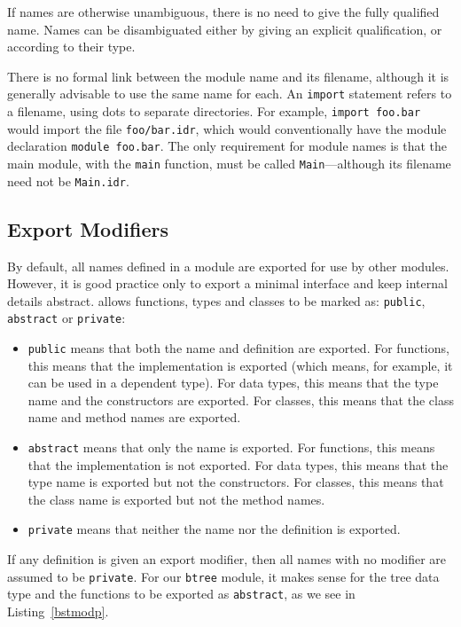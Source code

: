 \noindent
If names are otherwise unambiguous, there is no need to give the fully qualified name.
Names can be disambiguated either by giving an explicit qualification, or according to their type.

There is no formal link between the module name and its filename, although it is generally advisable to use the same name for each.
An \texttt{import} statement refers to a filename, using dots to separate directories.
For example, \texttt{import foo.bar} would import the file \texttt{foo/bar.idr}, which would conventionally have the module declaration \texttt{module foo.bar}.
The only requirement for module names is that the main module, with the \texttt{main} function, must be called \texttt{Main}---although its filename need not be \texttt{Main.idr}.

\subsection{Export Modifiers}

By default, all names defined in a module are exported for use by other modules.
However, it is good practice only to export a minimal interface and keep internal details abstract.
\Idris{} allows functions, types and classes to be marked as: \texttt{public}, \texttt{abstract} or \texttt{private}:

\begin{itemize}
\item \texttt{public} means that both the name and definition are exported.
For functions, this means that the implementation is exported (which means, for example, it can be used in a dependent type).
For data types, this means that the type name and the constructors are exported.
For classes, this means that the class name and method names are exported.

\item
\texttt{abstract} means that only the name is exported.
For functions, this means that the implementation is not exported.
For data types, this means that the type name is exported but not the constructors.
For classes, this means that the class name is exported but not the method names.

\item
\texttt{private} means that neither the name nor the definition is exported.
\end{itemize}

\noindent
If any definition is given an export modifier, then all names with no modifier are assumed to be \texttt{private}.
For our \texttt{btree} module, it makes sense for the tree data type and the functions to be exported as \texttt{abstract}, as we see in Listing~\ref{bstmodp}.

